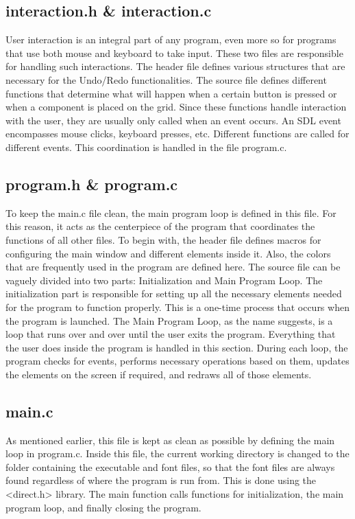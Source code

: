 \documentclass[report]{subfiles}
\begin{document}
    \subsection{interaction.h \& interaction.c}
    User interaction is an integral part of any program, even more so for programs that use both mouse and keyboard to take input. These two files are responsible for handling such interactions. The header file defines various structures that are necessary for the Undo/Redo functionalities.
    The source file defines different functions that determine what will happen when a certain button is pressed or when a component is placed on the grid. Since these functions handle interaction with the user, they are usually only called when an event occurs. An SDL event encompasses mouse clicks, keyboard presses, etc. Different functions are called for different events. This coordination is handled in the file program.c.
    \subsection{program.h \& program.c}
    To keep the main.c file clean, the main program loop is defined in this file. For this reason, it acts as the centerpiece of the program that coordinates the functions of all other files. To begin with, the header file defines macros for configuring the main window and different elements inside it. Also, the colors that are frequently used in the program are defined here.
    The source file can be vaguely divided into two parts: Initialization and Main Program Loop. The initialization part is responsible for setting up all the necessary elements needed for the program to function properly. This is a one-time process that occurs when the program is launched.
    The Main Program Loop, as the name suggests, is a loop that runs over and over until the user exits the program. Everything that the user does inside the program is handled in this section. During each loop, the program checks for events, performs necessary operations based on them, updates the elements on the screen if required, and redraws all of those elements.
    \subsection{main.c}
    As mentioned earlier, this file is kept as clean as possible by defining the main loop in program.c. Inside this file, the current working directory is changed to the folder containing the executable and font files, so that the font files are always found regardless of where the program is run from. This is done using the <direct.h> library.
    The main function calls functions for initialization, the main program loop, and finally closing the program.
    
\end{document}
